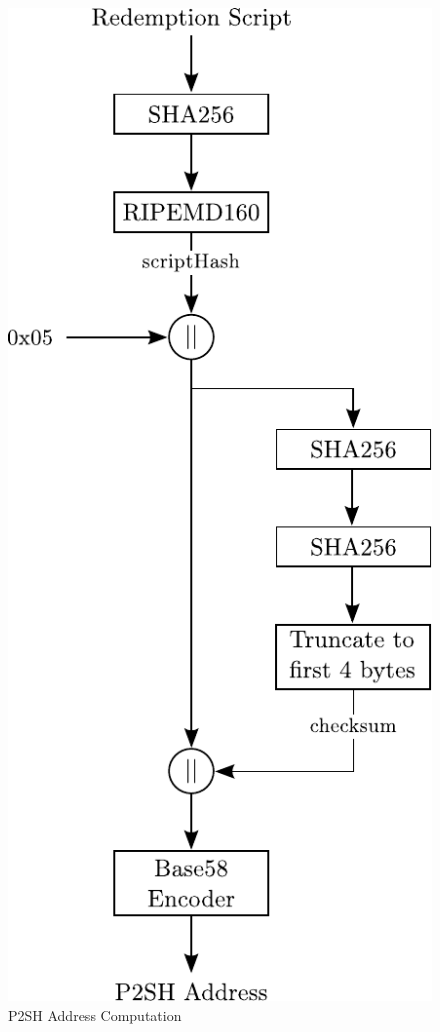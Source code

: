 \begin{figure}[htbp]

\centering
\includegraphics[scale=0.8]{images/BitcoinAddress-P2SH.pdf}

\caption{P2SH Address Computation}
\label{fig:BitcoinAddress-P2SH}
\end{figure}
\vspace{-10pt}


